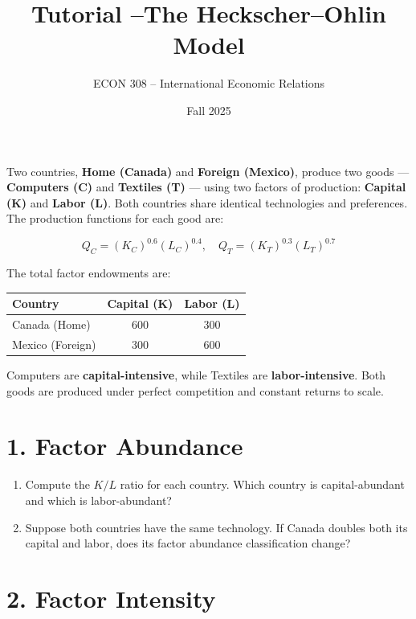 \documentclass[12pt]{article}
\title{Tutorial  --The Heckscher--Ohlin Model}
\author{ECON 308 -- International Economic Relations}
\date{Fall 2025}
\begin{document}
\maketitle

\noindent
Two countries, \textbf{Home (Canada)} and \textbf{Foreign (Mexico)}, produce two goods — \textbf{Computers (C)} and \textbf{Textiles (T)} — using two factors of production: \textbf{Capital (K)} and \textbf{Labor (L)}.  
Both countries share identical technologies and preferences. The production functions for each good are:

\[
Q_C = (K_C)^{0.6}(L_C)^{0.4}, \quad Q_T = (K_T)^{0.3}(L_T)^{0.7}
\]

\noindent
The total factor endowments are:

\begin{center}
\begin{tabular}{lcc}
\toprule
\textbf{Country} & \textbf{Capital (K)} & \textbf{Labor (L)} \\
\midrule
Canada (Home) & 600 & 300 \\
Mexico (Foreign) & 300 & 600 \\
\bottomrule
\end{tabular}
\end{center}

\noindent
Computers are \textbf{capital-intensive}, while Textiles are \textbf{labor-intensive}.  
Both goods are produced under perfect competition and constant returns to scale.

\section*{1. Factor Abundance}

\begin{enumerate}
    \item Compute the \( K/L \) ratio for each country. Which country is capital-abundant and which is labor-abundant?
    \item Suppose both countries have the same technology. If Canada doubles both its capital and labor, does its factor abundance classification change?
\end{enumerate}
\newpage
\section*{2. Factor Intensity}
\end{document}
